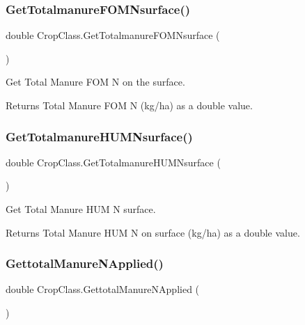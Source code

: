 \subsubsection{\texorpdfstring{GetTotalmanureFOMNsurface()}{GetTotalmanureFOMNsurface()}}
{\footnotesize\ttfamily double Crop\+Class.\+Get\+Totalmanure\+F\+O\+M\+Nsurface (\begin{DoxyParamCaption}{ }\end{DoxyParamCaption})\hspace{0.3cm}{\ttfamily [inline]}}



Get Total Manure F\+OM N on the surface. 

\begin{DoxyReturn}{Returns}
Total Manure F\+OM N (kg/ha) as a double value. 
\end{DoxyReturn}
\mbox{\label{class_crop_class_a1848a82c987f5eccbf4d937bafd3f5a1}} 
\subsubsection{\texorpdfstring{GetTotalmanureHUMNsurface()}{GetTotalmanureHUMNsurface()}}
{\footnotesize\ttfamily double Crop\+Class.\+Get\+Totalmanure\+H\+U\+M\+Nsurface (\begin{DoxyParamCaption}{ }\end{DoxyParamCaption})\hspace{0.3cm}{\ttfamily [inline]}}



Get Total Manure H\+UM N surface. 

\begin{DoxyReturn}{Returns}
Total Manure H\+UM N on surface (kg/ha) as a double value. 
\end{DoxyReturn}
\mbox{\label{class_crop_class_afa8dfc58b5ac99a5584c8964856ab573}} 
\subsubsection{\texorpdfstring{GettotalManureNApplied()}{GettotalManureNApplied()}}
{\footnotesize\ttfamily double Crop\+Class.\+Gettotal\+Manure\+N\+Applied (\begin{DoxyParamCaption}{ }\end{DoxyParamCaption})\hspace{0.3cm}{\ttfamily [inline]}}



